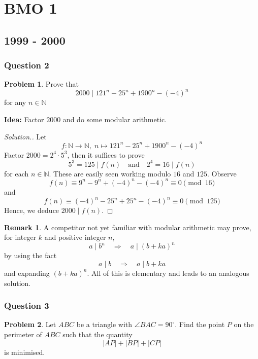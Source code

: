 \documentclass[11pt]{article}
\theoremstyle{definition}
\newtheorem*{problem}{Problem}
\newtheorem*{remark}{Remark}
\begin{document}
\newpage

\section{BMO 1}

\subsection{1999 - 2000}

\subsubsection{Question 2}

\begin{problem}
    Prove that \[2000 \; {\Big |} \; 121^n - 25^n + 1900^n - {(-4)}^n\] 
    for any $n \in \mathbb{N}$
\end{problem}

{\bf Idea: } Factor $2000$ and do some modular arithmetic. 

\begin{proof}[Solution.]

Let \[f: \mathbb{N} \to \mathbb{N}, \; n \mapsto 121^n - 25^n + 1900^n - {(-4)}^n\]
Factor $2000 = 2^4 \cdot 5^3$, then it suffices to prove 
\[5^3 = 125 \; {\Big |} \; f(n) \quad \text{and} \quad 2^4 = 16 \; {\Big |} \; f(n)\]
for each $n \in \mathbb{N}$. These are easily seen working modulo $16$ and $125$. Observe
\[f(n) \equiv 9^n - 9^n + (-4)^n - (-4)^n \equiv 0 \pmod {16}\]
and 
\[f(n) \equiv (-4)^n - 25^n + 25^n - (-4)^n \equiv 0 \pmod {125}\]
Hence, we deduce $2000 \mid f(n)$.
\end{proof}

\begin{remark}
    A competitor not yet familiar with modular arithmetic may prove, for integer $k$ and positive integer $n$,
    \[a \; {\Big |} \; b^n \quad \Longrightarrow \quad a \; {\Big |} \; (b + ka)^n\]
    by using the fact 
    \[a \; {\Big |} \; b \quad \Longrightarrow \quad a \; {\Big |} \; b + ka\]
    and expanding $(b + ka)^n$. All of this is elementary and leads to an analogous solution. 
\end{remark}

\newpage 

\subsubsection{Question 3}

\begin{problem}
Let $ABC$ be a triangle with $\angle BAC = 90^\circ$. Find the point $P$ on the perimeter of $ABC$ such that the 
quantity \[|AP| + |BP| + |CP|\] is minimised.
\end{problem}
\end{document}
